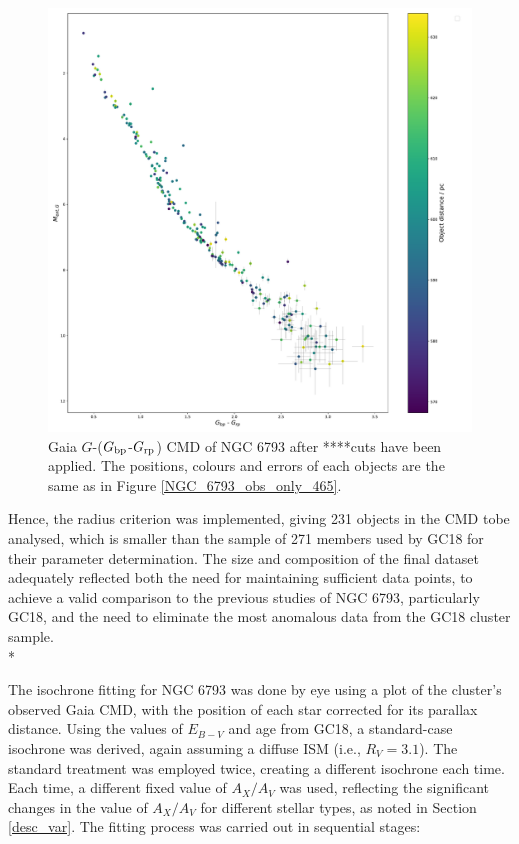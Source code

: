 \documentclass[12pt, a4paper]{report}
\begin{document}
\begin{figure}[h!]
\begin{center}
\includegraphics[width=1.0\textwidth]{../NGC_6793_CMD_observational_errorbars_vizier.pdf}
\caption{Gaia $G$-($G_{\textnormal{bp}}$-$G_{\textnormal{rp}}$) CMD of NGC 6793 after ****cuts have been applied. The positions, colours and errors of each objects are the same as in Figure \ref{NGC_6793_obs_only_465}.}
\label{NGC_6793_obs_only}
\end{center}
\end{figure}

Hence, the radius criterion was implemented, giving 231 objects in the CMD tobe analysed, which is smaller than the sample of 271 members used by GC18 for their parameter determination. The size and composition of the final dataset adequately reflected both the need for maintaining sufficient data points, to achieve a valid comparison to the previous studies of NGC 6793, particularly GC18, and the need to eliminate the most anomalous data from the GC18 cluster sample.\\*


The isochrone fitting for NGC 6793 was done by eye using a plot of the cluster's observed Gaia CMD, with the position of each star corrected for its parallax distance. Using the values of $E_{B-V}$ and age from GC18, a standard-case isochrone was derived, again assuming a diffuse ISM (i.e., $R_{V} = 3.1$). The standard treatment was employed twice, creating a different isochrone each time. Each time, a different fixed value of $A_{X}/A_{V}$ was used, reflecting the significant changes in the value of $A_{X}/A_{V}$ for different stellar types, as noted in Section \ref{desc_var}. The fitting process was carried out in sequential stages:
\end{document}

